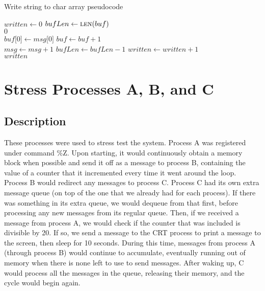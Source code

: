 \documentclass[12pt]{report}
\begin{document}
    \begin{algorithm}
        \caption{Write string to char array pseudocode}
        \label{code:write_string}
        \begin{algorithmic}[1]

                \State $written \gets 0$
                \State $bufLen \gets \Call {len}{buf}$\\

                    \State \Return $0$
                \EndIf\\

                        \State $buf \lbrack 0 \rbrack \gets msg \lbrack 0
                            \rbrack$
                        \State $buf \gets buf + 1$
                    \EndIf\\

                    \State $msg \gets msg + 1$
                    \State $bufLen \gets bufLen - 1$
                    \State $written \gets written + 1$
                \EndWhile\\

                \State \Return $written$
            \EndFunction
        \end{algorithmic}
    \end{algorithm}

\chapter{Stress Processes A, B, and C}

\section{Description}
    These processes were used to stress test the system.  Process A was
    registered under command \%Z.  Upon starting, it would continuously obtain
    a memory block when possible and send it off as a message to process B,
    containing the value of a counter that it incremented every time it went
    around the loop.  Process B would redirect any messages to process C.
    Process C had its own extra message queue (on top of the one that we already
    had for each process).  If there was something in its extra queue, we would
    dequeue from that first, before processing any new messages from its regular
    queue.  Then, if we received a message from process A, we would check if the
    counter that was included is divisible by 20.  If so, we send a message to
    the CRT process to print a message to the screen, then sleep for 10 seconds.
    During this time, messages from process A (through process B) would continue
    to accumulate, eventually running out of memory when there is none left to
    use to send messages.  After waking up, C would process all the messages in
    the queue, releasing their memory, and the cycle would begin again.
\end{document}
